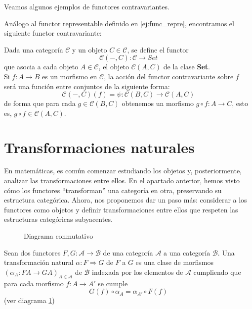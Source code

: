 Veamos algunos ejemplos de functores contravariantes.

\begin{ejemplo}
    Análogo al functor representable definido en \ref{ej:func_repre}, encontramos el siguiente functor contravariante:

    Dada una categoría $\mathscr{C}$ y un objeto $C \in \mathscr{C}$, se define el functor \begin{equation}
        \mathscr{C}(-,C): \mathscr{C} \longrightarrow Set
    \end{equation} que asocia a cada objeto $A \in \mathscr{C}$, el objeto $\mathscr{C}(A,C)$ de la clase \textbf{Set}. \\
    Si $f: A \longrightarrow B$ es un morfismo en $\mathscr{C}$, la acción  del functor contravariante sobre $f$ será una función entre conjuntos de la siguiente forma: 
    \begin{equation}
        \mathscr{C}(-,C)(f) = \psi: \mathscr{C}(B,C) \longrightarrow \mathscr{C}(A,C)
    \end{equation} de forma que para cada $g \in \mathscr{C}(B,C)$ obtenemos un morfismo $g \circ f: A \longrightarrow C$, esto es, $g \circ f \in \mathscr{C}(A,C).$    
\end{ejemplo}

\section{Transformaciones naturales}
En matemáticas, es común comenzar estudiando los objetos y, posteriormente, analizar las transformaciones entre ellos. En el apartado anterior, hemos visto cómo los functores ``transforman'' una categoría en otra, preservando su estructura categórica. Ahora, nos proponemos dar un paso más: considerar a los functores como objetos y definir transformaciones entre ellos que respeten las estructuras categóricas subyacentes.

\begin{figure}[htpb]
    \centering
    \caption{Diagrama conmutativo}
    \label{diag:trans_natural}
\end{figure}

\begin{definicion}
    Sean dos functores $F,G: \mathscr{A} \longrightarrow \mathscr{B}$ de una categoría $\mathscr{A}$ a una categoría $\mathscr{B}$. Una transformación natural $\alpha: F \Rightarrow G$ de $F$ a $G$ es una clase de morfismos $(\alpha_A:FA \longrightarrow GA)_{A\in \mathscr{A}}$ de $\mathscr{B}$ indexada por los elementos de $\mathscr{A}$ cumpliendo que para cada morfismo $f: A \longrightarrow A'$ se cumple \begin{equation}
        G(f) \circ \alpha_{A} = \alpha_{A'} \circ F(f)
    \end{equation}
    (ver diagrama \ref{diag:trans_natural})
    \label{t_natural_1}
\end{definicion}

